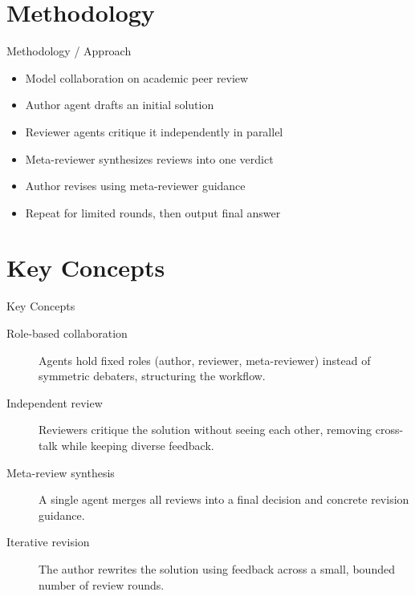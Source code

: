 \documentclass[10pt]{beamer}
\begin{document}
\section{Methodology}
\begin{frame}[allowframebreaks]{Methodology / Approach}
\begin{itemize}
  \item Model collaboration on academic peer review
  \item Author agent drafts an initial solution
  \item Reviewer agents critique it independently in parallel
  \item Meta-reviewer synthesizes reviews into one verdict
  \item Author revises using meta-reviewer guidance
  \item Repeat for limited rounds, then output final answer
\end{itemize}
\end{frame}

\section{Key Concepts}
\begin{frame}[allowframebreaks]{Key Concepts}
  \begin{description}
    \item[Role-based collaboration] Agents hold fixed roles (author, reviewer, meta-reviewer) instead of symmetric debaters, structuring the workflow.
    \item[Independent review] Reviewers critique the solution without seeing each other, removing cross-talk while keeping diverse feedback.
    \item[Meta-review synthesis] A single agent merges all reviews into a final decision and concrete revision guidance.
    \item[Iterative revision] The author rewrites the solution using feedback across a small, bounded number of review rounds.
  \end{description}
\end{frame}
\end{document}
